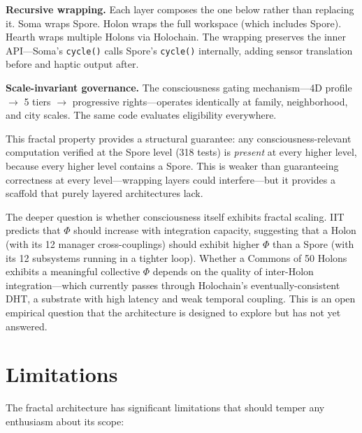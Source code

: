 \documentclass[12pt]{book}
\begin{document}
\textbf{Recursive wrapping.} Each layer composes the one below rather than replacing it. Soma wraps Spore. Holon wraps the full workspace (which includes Spore). Hearth wraps multiple Holons via Holochain. The wrapping preserves the inner API---Soma's \texttt{cycle()} calls Spore's \texttt{cycle()} internally, adding sensor translation before and haptic output after.

\textbf{Scale-invariant governance.} The consciousness gating mechanism---4D profile $\to$ 5 tiers $\to$ progressive rights---operates identically at family, neighborhood, and city scales. The same code evaluates eligibility everywhere.

This fractal property provides a structural guarantee: any consciousness-relevant computation verified at the Spore level (318 tests) is \textit{present} at every higher level, because every higher level contains a Spore. This is weaker than guaranteeing correctness at every level---wrapping layers could interfere---but it provides a scaffold that purely layered architectures lack.

The deeper question is whether consciousness itself exhibits fractal scaling. IIT predicts that $\Phi$ should increase with integration capacity, suggesting that a Holon (with its 12 manager cross-couplings) should exhibit higher $\Phi$ than a Spore (with its 12 subsystems running in a tighter loop). Whether a Commons of 50 Holons exhibits a meaningful collective $\Phi$ depends on the quality of inter-Holon integration---which currently passes through Holochain's eventually-consistent DHT, a substrate with high latency and weak temporal coupling. This is an open empirical question that the architecture is designed to explore but has not yet answered.

\section{Limitations}

The fractal architecture has significant limitations that should temper any enthusiasm about its scope:
\end{document}
